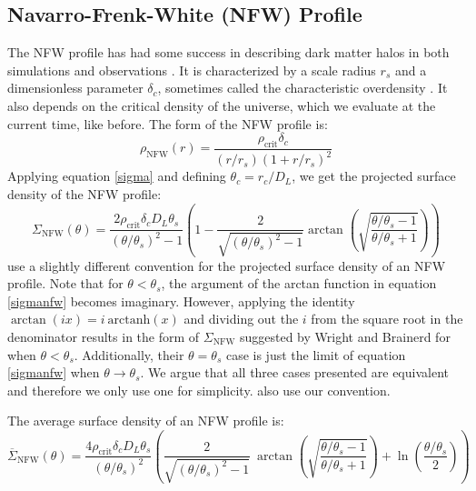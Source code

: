 \documentclass[10pt]{article}
\begin{document}
\subsection{Navarro-Frenk-White (NFW) Profile} \label{nfwsection}
The NFW profile has had some success in describing dark matter halos in both simulations and observations \citep{Navarro1997}. It is characterized by a scale radius $r_s$ and a dimensionless parameter $\delta_c$, sometimes called the characteristic overdensity \citep{Wright2000}. It also depends on the critical density of the universe, which we evaluate at the current time, like before. The form of the NFW profile is:
\begin{equation}
\rho_\mathrm{NFW}(r) = \frac{\rho_\mathrm{crit} \delta_c}{(r/r_s)\left(1 + r/r_s\right)^2}
\end{equation}
Applying equation \ref{sigma} and defining $\theta_c = r_c/D_L$, we get the projected surface density of the NFW profile:
\begin{equation} \label{sigmanfw}
\Sigma_\mathrm{NFW}(\theta) = \frac{2 \rho_\mathrm{crit} \delta_c D_L \theta_s}{(\theta/\theta_s)^2 - 1} \left(1 - \frac{2}{\sqrt{(\theta/\theta_s)^2 - 1}} \arctan\left(\sqrt{\frac{\theta/\theta_s - 1}{\theta/\theta_s + 1}} \right) \right)
\end{equation}
\citet{Wright2000} use a slightly different convention for the projected surface density of an NFW profile. Note that for $\theta < \theta_s$, the argument of the arctan function in equation \ref{sigmanfw} becomes imaginary. However, applying the identity $\arctan(i x) = i\ \mathrm{arctanh}(x)$ and dividing out the $i$ from the square root in the denominator results in the form of $\Sigma_\mathrm{NFW}$ suggested by Wright and Brainerd for when  $\theta < \theta_s$. Additionally, their $\theta = \theta_s$ case is just the limit of equation \ref{sigmanfw} when $\theta \rightarrow \theta_s$. We argue that all three cases presented are equivalent and therefore we only use one for simplicity. \citet{Bartelmann2001} also use our convention.

The average surface density of an NFW profile is:
\begin{equation} \label{sigmabarnfw}
\overline{\Sigma}_\mathrm{NFW}(\theta) = \frac{4 \rho_\mathrm{crit} \delta_c D_L \theta_s}{(\theta/\theta_s)^2} \left(
    \frac{2}{\sqrt{(\theta/\theta_s)^2 - 1}} ~\arctan\left(\sqrt{\frac{\theta/\theta_s - 1}{\theta/\theta_s + 1}} \right) + \ln{\left(\frac{\theta/\theta_s}{2}\right)}
\right)
\end{equation}
\end{document}
